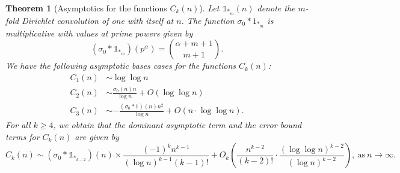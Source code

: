 \documentclass[11pt,reqno,a4letter]{article}
\numberwithin{figure}{section}
\numberwithin{table}{section}
\theoremstyle{plain}
\newtheorem{theorem}{Theorem}
\numberwithin{theorem}{section}
\theoremstyle{definition}
\begin{document}
\begin{theorem}[Asymptotics for the functions $C_k(n)$] 
\label{theorem_Ckn_GeneralAsymptoticsForms} 
Let $\mathds{1}_{\ast_m}(n)$ denote the $m$-fold Dirichlet convolution of one with itself at $n$. 
The function $\sigma_0 \ast 1_{\ast_m}$ is multiplicative with values at prime powers 
given by 
\[
(\sigma_0 \ast \mathds{1}_{\ast_m})(p^{\alpha}) = \binom{\alpha+m+1}{m+1}. 
\]
We have the following asymptotic bases cases for the functions $C_k(n)$: 
\begin{align*} 
C_1(n) & \sim \log\log n \\ 
C_2(n) & \sim \frac{\sigma_0(n) n}{\log n} + O(\log\log n) \\ 
C_3(n) & \sim -\frac{(\sigma_0 \ast 1)(n) n^2}{\log n} + 
     O\left(n \cdot \log\log n\right). 
\end{align*} 
For all $k \geq 4$, we obtain that the dominant asymptotic term and the error bound terms for 
$C_k(n)$ are given by 
\[
C_k(n) \sim (\sigma_0 \ast \mathds{1}_{\ast_{k-2}})(n) \times \frac{(-1)^{k} n^{k-1}}{(\log n)^{k-1} (k-1)!} + 
     O_k\left(\frac{n^{k-2}}{(k-2)!} \cdot \frac{(\log\log n)^{k-2}}{(\log n)^{k-2}}\right), 
     \mathrm{\ as\ }n \rightarrow \infty. 
\]
\end{theorem} 
\end{document}
